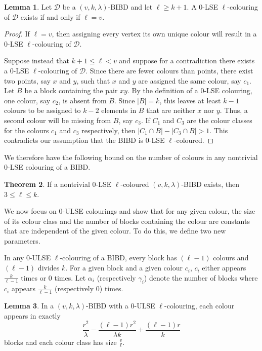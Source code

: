 \documentclass[12pt]{article}
\theoremstyle{definition}
\newtheorem{theorem}{Theorem}[section]
\newtheorem{lemma}[theorem]{Lemma}
\begin{document}
\begin{lemma}\label{lem: upp bound on num of colours nB = 0}
    Let $\mathcal{D}$ be a $(v,k,\lambda)$-BIBD and let $\ell \geq k+1$. A $0$-LSE $\ell$-colouring of $\mathcal{D}$ exists if and only if $\ell = v$.
\end{lemma}

\begin{proof}
    If $\ell = v$, then assigning every vertex its own unique colour will result in a $0$-LSE $\ell$-colouring of $\mathcal{D}$.

    Suppose instead that $k+1 \leq \ell < v$ and suppose for a contradiction there exists a $0$-LSE $\ell$-colouring of $\mathcal{D}$. Since there are fewer colours than points, there exist two points, say $x$ and $y$, such that $x$ and $y$ are assigned the same colour, say $c_1$. Let $B$ be a block containing the pair $xy$. By the definition of a $0$-LSE colouring, one colour, say $c_2$, is absent from $B$. Since $|B| = k$, this leaves at least $k-1$ colours to be assigned to $k-2$ elements in $B$ that are neither $x$ nor $y$. Thus, a second colour will be missing from $B$, say $c_3$. If $C_1$ and $C_3$ are the colour classes for the colours $c_1$ and $c_3$ respectively, then $|C_1 \cap B| - |C_3 \cap B| > 1$. This contradicts our assumption that the BIBD is $0$-LSE $\ell$-coloured. 
\end{proof}

We therefore have the following bound on the number of colours in any nontrivial $0$-LSE colouring of a BIBD. 

\begin{theorem}\label{thm: nontrivial LSE cols bounds on ell}
    If a nontrivial $0$-LSE $\ell$-coloured $(v,k,\lambda)$-BIBD exists, then $3\leq \ell \leq k$.
\end{theorem}

We now focus on $0$-ULSE colourings and show that for any given colour, the size of its colour class and the number of blocks containing the colour are constants that are independent of the given colour. To do this, we define two new parameters.

In any $0$-ULSE $\ell$-colouring of a BIBD, every block has $(\ell - 1)$ colours and $(\ell - 1)$ divides $k$. For a given block and a given colour $c_i$, $c_i$ either appears $\frac{k}{\ell-1}$ times or $0$ times. Let $\alpha_i$ (respectively $\gamma_i$) denote the number of blocks where $c_i$ appears $\frac{k}{\ell-1}$ (respectively $0$) times.

\begin{lemma}\label{lem: l-1 divides k, colour classes the same size, calculating alpha}
    In a $(v,k,\lambda)$-BIBD with a $0$-ULSE $\ell$-colouring, each colour appears in exactly \[\frac{r^2}{\lambda} - \frac{(\ell - 1) r^2}{\lambda k} + \frac{(\ell - 1)r}{k}\] blocks and each colour class has size $\frac{v}{\ell}$.
\end{lemma}
\end{document}
